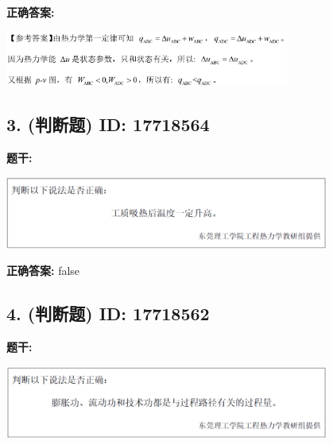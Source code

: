 \documentclass[12pt]{article}
\begin{document}
\textbf{正确答案:}

\begin{center}\includegraphics[width=0.7\textwidth, height=0.2\textheight, keepaspectratio]{question_2_17718570/correct_answer_1_img_1.png}\end{center}

\vspace{0.5em}\hrulefill\vspace{1em}

\subsection*{3. (判断题) \small ID: 17718564}

\textbf{题干:}


\begin{center}\includegraphics[width=0.8\textwidth, height=0.25\textheight, keepaspectratio]{question_3_17718564/title_img_1.png}\end{center}

\textbf{正确答案:}
false

\vspace{0.5em}\hrulefill\vspace{1em}

\subsection*{4. (判断题) \small ID: 17718562}

\textbf{题干:}


\begin{center}\includegraphics[width=0.8\textwidth, height=0.25\textheight, keepaspectratio]{question_4_17718562/title_img_1.png}\end{center}
\end{document}
